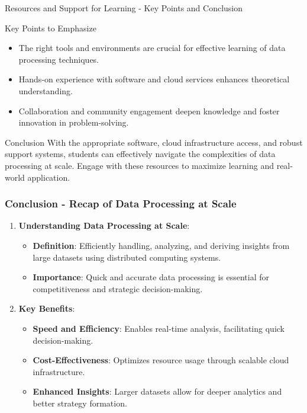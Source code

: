 \documentclass[aspectratio=169]{beamer}
\begin{document}
\begin{frame}[fragile]{Resources and Support for Learning - Key Points and Conclusion}
    \begin{block}{Key Points to Emphasize}
        \begin{itemize}
            \item The right tools and environments are crucial for effective learning of data processing techniques.
            \item Hands-on experience with software and cloud services enhances theoretical understanding.
            \item Collaboration and community engagement deepen knowledge and foster innovation in problem-solving.
        \end{itemize}
    \end{block}

    \begin{block}{Conclusion}
        With the appropriate software, cloud infrastructure access, and robust support systems, students can effectively navigate the complexities of data processing at scale. Engage with these resources to maximize learning and real-world application.
    \end{block}
\end{frame}

\begin{frame}[fragile]
    \frametitle{Conclusion - Recap of Data Processing at Scale}
    \begin{enumerate}
        \item \textbf{Understanding Data Processing at Scale}:
            \begin{itemize}
                \item \textbf{Definition}: Efficiently handling, analyzing, and deriving insights from large datasets using distributed computing systems.
                \item \textbf{Importance}: Quick and accurate data processing is essential for competitiveness and strategic decision-making.
            \end{itemize}
        
        \item \textbf{Key Benefits}:
            \begin{itemize}
                \item \textbf{Speed and Efficiency}: Enables real-time analysis, facilitating quick decision-making.
                \item \textbf{Cost-Effectiveness}: Optimizes resource usage through scalable cloud infrastructure.
                \item \textbf{Enhanced Insights}: Larger datasets allow for deeper analytics and better strategy formation.
            \end{itemize}
    \end{enumerate}
\end{frame}
\end{document}
